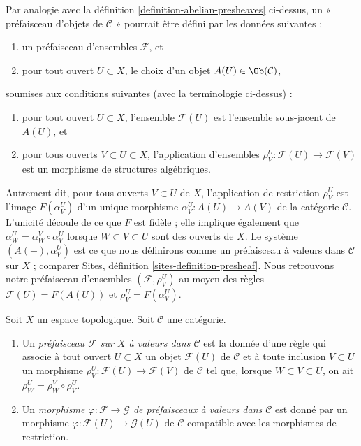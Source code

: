 \medskip\noindent
Par analogie avec la définition \ref{definition-abelian-presheaves}
ci-dessus, un « préfaisceau d'objets de $\mathcal{C}$ » pourrait être
défini par les données suivantes :
\begin{enumerate}
\item un préfaisceau d'ensembles $\mathcal{F}$, et
\item pour tout ouvert $U \subset X$, le choix
d'un objet $A(U) \in \Ob(\mathcal{C})$,
\end{enumerate}
soumises aux conditions suivantes (avec la terminologie ci-dessus) :
\begin{enumerate}
\item pour tout ouvert $U \subset X$, l'ensemble $\mathcal{F}(U)$
est l'ensemble sous-jacent de $A(U)$, et
\item pour tous ouverts $V \subset U \subset X$,
l'application d'ensembles $\rho_V^U: \mathcal{F}(U) \to \mathcal{F}(V)$
est un morphisme de structures algébriques.
\end{enumerate}
Autrement dit, pour tous ouverts $V \subset U$ de $X$,
l'application de restriction $\rho^U_V$ est l'image
$F(\alpha^U_V)$ d'un unique morphisme
$\alpha^U_V : A(U) \to A(V)$ de la catégorie $\mathcal{C}$.
L'unicité découle de ce que $F$ est
fidèle ; elle implique également que
$\alpha^U_W = \alpha^V_W \circ \alpha^U_V$
lorsque $W \subset V \subset U$ sont des ouverts de $X$.
Le système $(A(-), \alpha^U_V)$ est ce que nous définirons comme un
préfaisceau à valeurs dans $\mathcal{C}$ sur $X$ ; comparer
Sites, définition \ref{sites-definition-presheaf}.
Nous retrouvons notre préfaisceau d'ensembles $(\mathcal{F}, \rho_V^U)$
au moyen des règles $\mathcal{F}(U) = F(A(U))$ et
$\rho_V^U = F(\alpha_V^U)$.

\begin{definition}
\label{definition-presheaf-values-in-category}
Soit $X$ un espace topologique.
Soit $\mathcal{C}$ une catégorie.
\begin{enumerate}
\item Un {\it préfaisceau $\mathcal{F}$ sur $X$ à valeurs dans $\mathcal{C}$}
est la donnée d'une règle qui associe à tout ouvert $U \subset X$
un objet $\mathcal{F}(U)$ de $\mathcal{C}$
et à toute inclusion $V \subset U$
un morphisme $\rho_V^U : \mathcal{F}(U) \to \mathcal{F}(V)$
de $\mathcal{C}$ tel que, lorsque $W \subset V \subset U$,
on ait $\rho_W^U = \rho_W^V \circ \rho_V^U$.
\item Un {\it morphisme $\varphi : \mathcal{F} \to \mathcal{G}$
de préfaisceaux à valeurs dans $\mathcal{C}$} est donné par un
morphisme $\varphi : \mathcal{F}(U) \to \mathcal{G}(U)$
de $\mathcal{C}$ compatible avec les morphismes de restriction.
\end{enumerate}
\end{definition}

